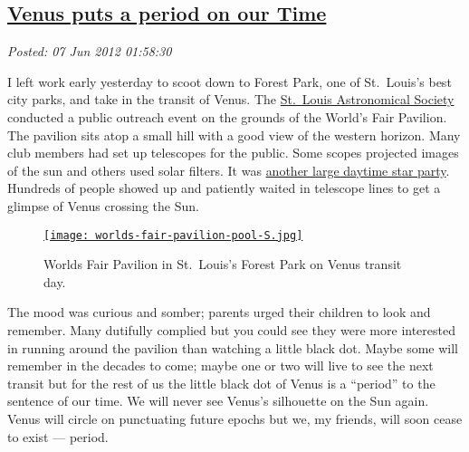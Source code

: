%

\subsection*{\href{https://bakerjd99.wordpress.com/2012/06/06/venus-puts-a-period-on-our-time/}{Venus puts a period on our Time}}


\noindent\emph{Posted: 07 Jun 2012 01:58:30}
\vspace{6pt}

I left work early yesterday to scoot down to Forest Park, one of St.\
Louis's best city parks, and take in the transit of Venus. The
\href{http://www.slasonline.org/}{St.\ Louis Astronomical Society}
conducted a public outreach event on the grounds of the World's Fair
Pavilion. The pavilion sits atop a small hill with a good view of the
western horizon. Many club members had set up telescopes for the public.
Some scopes projected images of the sun and others used solar filters.
It was
\href{http://bakerjd99.wordpress.com/2012/05/22/the-wahweap-wow/}{another
large daytime star party}. Hundreds of people showed up and patiently
waited in telescope lines to get a glimpse of Venus crossing the Sun.



\captionsetup[figure]{labelformat=empty}
\begin{figure}[htbp]
\centering
\href{http://conceptcontrol.smugmug.com/Places/USA-and-Canada/Missouri-Moments/14124438\_8dvZ6h}{\texttt{[image: worlds-fair-pavilion-pool-S.jpg]}}
\caption{Worlds Fair Pavilion in St.\ Louis's Forest Park on Venus transit day.}
\label{fig:2910X0}
\end{figure}


The mood was curious and somber; parents urged their children to look
and remember. Many dutifully complied but you could see they were more
interested in running around the pavilion than watching a little black
dot. Maybe some will remember in the decades to come; maybe one or two
will live to see the next transit but for the rest of us the little
black dot of Venus is a ``period'' to the sentence of our time. We will
never see Venus's silhouette on the Sun again. Venus will circle on
punctuating future epochs but we, my friends, will soon cease to exist
--- period.


